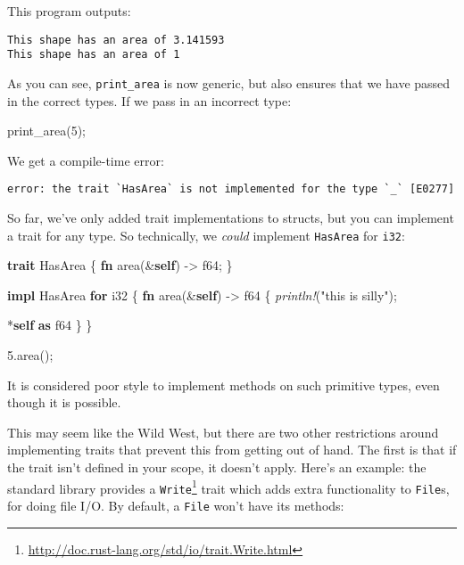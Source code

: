 \documentclass[a4paper,]{book}
\newenvironment{Shaded}{\begin{snugshade}}{\end{snugshade}}
\newcommand{\KeywordTok}[1]{\textcolor[rgb]{0.13,0.29,0.53}{\textbf{{#1}}}}
\newcommand{\DataTypeTok}[1]{\textcolor[rgb]{0.13,0.29,0.53}{{#1}}}
\newcommand{\DecValTok}[1]{\textcolor[rgb]{0.00,0.00,0.81}{{#1}}}
\newcommand{\StringTok}[1]{\textcolor[rgb]{0.31,0.60,0.02}{{#1}}}
\newcommand{\PreprocessorTok}[1]{\textcolor[rgb]{0.56,0.35,0.01}{\textit{{#1}}}}
\newcommand{\NormalTok}[1]{{#1}}
\renewcommand{\href}[2]{#2\footnote{\url{#1}}}
\begin{document}
This program outputs:

\begin{verbatim}
This shape has an area of 3.141593
This shape has an area of 1
\end{verbatim}

As you can see, \texttt{print\_area} is now generic, but also ensures
that we have passed in the correct types. If we pass in an incorrect
type:

\begin{Shaded}
\begin{Highlighting}[]
\NormalTok{print_area(}\DecValTok{5}\NormalTok{);}
\end{Highlighting}
\end{Shaded}

We get a compile-time error:

\begin{verbatim}
error: the trait `HasArea` is not implemented for the type `_` [E0277]
\end{verbatim}

So far, we've only added trait implementations to structs, but you can
implement a trait for any type. So technically, we \emph{could}
implement \texttt{HasArea} for \texttt{i32}:

\begin{Shaded}
\begin{Highlighting}[]
\KeywordTok{trait} \NormalTok{HasArea \{}
    \KeywordTok{fn} \NormalTok{area(&}\KeywordTok{self}\NormalTok{) -> }\DataTypeTok{f64}\NormalTok{;}
\NormalTok{\}}

\KeywordTok{impl} \NormalTok{HasArea }\KeywordTok{for} \DataTypeTok{i32} \NormalTok{\{}
    \KeywordTok{fn} \NormalTok{area(&}\KeywordTok{self}\NormalTok{) -> }\DataTypeTok{f64} \NormalTok{\{}
        \PreprocessorTok{println!}\NormalTok{(}\StringTok{"this is silly"}\NormalTok{);}

        \NormalTok{*}\KeywordTok{self} \KeywordTok{as} \DataTypeTok{f64}
    \NormalTok{\}}
\NormalTok{\}}

\DecValTok{5.}\NormalTok{area();}
\end{Highlighting}
\end{Shaded}

It is considered poor style to implement methods on such primitive
types, even though it is possible.

This may seem like the Wild West, but there are two other restrictions
around implementing traits that prevent this from getting out of hand.
The first is that if the trait isn't defined in your scope, it doesn't
apply. Here's an example: the standard library provides a
\href{http://doc.rust-lang.org/std/io/trait.Write.html}{\texttt{Write}}
trait which adds extra functionality to \texttt{File}s, for doing file
I/O. By default, a \texttt{File} won't have its methods:
\end{document}
